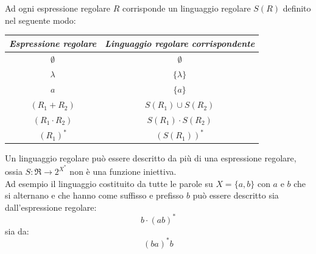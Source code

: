 \documentclass[12pt]{report}
\begin{document}
	Ad ogni espressione regolare $R$ corrisponde un linguaggio regolare $S(R)$ definito nel seguente modo: \\
	\begin{tabular}{|c|c|}
		\hline
		\textbf{\textit{Espressione regolare}} & \textbf{\textit{Linguaggio regolare corrispondente}}  \\
		\hline
		$\emptyset$ & $\emptyset$ \\
		\hline
		$\lambda$ & $\{\lambda\}$ \\
		\hline
		$a$ & $\{a\}$ \\
		\hline
		$(R_1 + R_2)$ & $S(R_1) \cup S(R_2)$ \\
		\hline
		$(R_1 \cdot R_2)$ & $S(R_1) \cdot S(R_2)$ \\
		\hline
		$(R_1)^*$ & $(S(R_1))^*$ \\
		\hline
	\end{tabular}
	{
	}
	Un linguaggio regolare può essere descritto da più di una espressione regolare, ossia $S: \mathfrak{R} \to 2^{X^*}$ non è una funzione iniettiva. \\
	Ad esempio il linguaggio costituito da tutte le parole su $X = \{a, b\}$ con $a$ e $b$ che si alternano e che hanno come suffisso e prefisso $b$ può essere descritto sia dall'espressione regolare:
	\[
	b\cdot(ab)^*
	\]
	sia da:
	\[
	(ba)^*b
	\]
	{
	}
\end{document}
